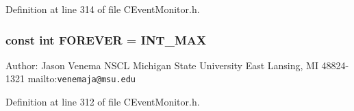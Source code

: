 Definition at line 314 of file CEvent\-Monitor.h.
\subsubsection{\setlength{\rightskip}{0pt plus 5cm}const int FOREVER = INT\_\-MAX\hspace{0.3cm}{\tt  [static]}}\label{CEventMonitor_8h_a0}


Author: Jason Venema NSCL Michigan State University East Lansing, MI 48824-1321 mailto:{\tt venemaja@msu.edu} 

Definition at line 312 of file CEvent\-Monitor.h.